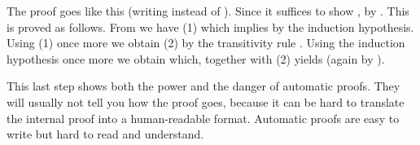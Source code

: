 \begin{isabellebody}
\begin{isamarkuptext}
\begin{isabelle}
\end{isabelle}
%
The proof goes like this (writing  instead of ).
Since  it suffices to show
\hbox{},
by \@.  This is
proved as follows. From  we have 
(1) which implies  by the induction hypothesis.
Using (1) once more we obtain  (2) by the transitivity
rule .
Using the induction hypothesis once more we obtain 
which, together with (2) yields  (again by
).

This last step shows both the power and the danger of automatic proofs.  They
will usually not tell you how the proof goes, because it can be hard to
translate the internal proof into a human-readable format.  Automatic
proofs are easy to write but hard to read and understand.


\end{isamarkuptext}
\end{isabellebody}
